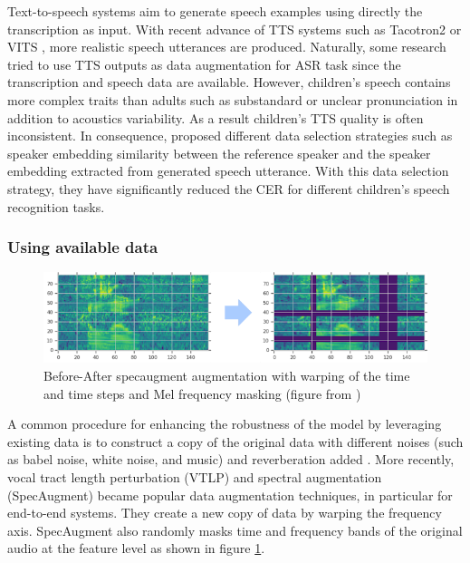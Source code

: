 Text-to-speech systems aim to generate speech examples using directly the transcription as input. With recent advance of TTS systems such as Tacotron2 \cite{shen2018natural} or VITS \cite{kim2021conditional}, more realistic speech utterances are produced. Naturally, some research tried to use TTS outputs as data augmentation for ASR task \cite{laptev2020you} since the transcription and speech data are available. However, children's speech contains more complex traits than adults such as substandard or unclear pronunciation in addition to acoustics variability. As a result children's TTS quality is often inconsistent. In consequence, \cite{wang2021towards} proposed different data selection strategies such as speaker embedding similarity between the reference speaker and the speaker embedding extracted from generated speech utterance. With this data selection strategy, they have significantly reduced the CER for different children's speech recognition tasks.

\subsubsection{Using available data}
\begin{figure}
    \centering
    \includegraphics[width=1\textwidth]{imgs/specaugment.png}
    \caption{Before-After specaugment augmentation with warping of the time and time steps and Mel frequency masking (figure from \cite{specaugment})}
    \label{fig:specaugment}
\end{figure}
A common procedure for enhancing the robustness of the model by leveraging existing data is to construct a copy of the original data with different noises (such as babel noise, white noise, and music) and reverberation added \cite{liu2003noise,whitenoise,gelin2020babble,couvreur2000use,malek2017robust}. 
More recently, vocal tract length perturbation (VTLP)\cite{VTLP} and spectral augmentation (SpecAugment) \cite{specaugment} became popular data augmentation techniques, in particular for end-to-end systems. They create a new copy of data by warping the frequency axis. SpecAugment also randomly masks time and frequency bands of the original audio at the feature level as shown in figure \ref{fig:specaugment}.

